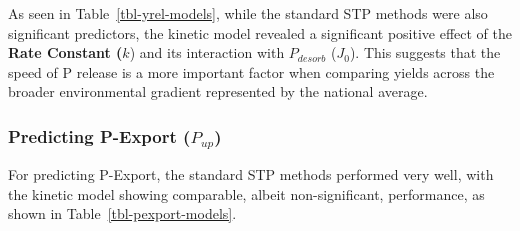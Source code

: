 \documentclass[
  a4paper,
]{article}
\begin{document}
As seen in Table~\ref{tbl-yrel-models}, while the standard STP methods
were also significant predictors, the kinetic model revealed a
significant positive effect of the \textbf{Rate Constant (}\(k\)) and
its interaction with \(P_{desorb}\) (\(J_0\)). This suggests that the
speed of P release is a more important factor when comparing yields
across the broader environmental gradient represented by the national
average.

\subsubsection{\texorpdfstring{Predicting P-Export
(\(P_{up}\))}{Predicting P-Export (P\_\{up\})}}\label{sec-pexport}

For predicting P-Export, the standard STP methods performed very well,
with the kinetic model showing comparable, albeit non-significant,
performance, as shown in Table~\ref{tbl-pexport-models}.
\end{document}
